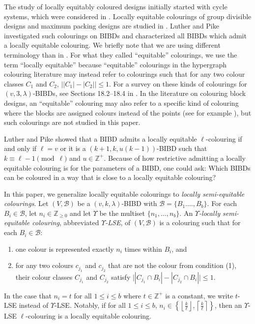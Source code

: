 \documentclass[12pt]{article}
\theoremstyle{definition}
\newcommand{\deviations}{\Upsilon}
\begin{document}
The study of locally equitably coloured designs initially started with cycle systems, which were considered in \cite{ABLW04, ABW07, BM21, BM24, LW05, W05, W06}. Locally equitable colourings of group divisible designs and maximum packing designs are studied in \cite{BDDKLPY26}. Luther and Pike \cite{L16, LP16} investigated such colourings on BIBDs and characterized all BIBDs which admit a locally equitable colouring. We briefly note that we are using different terminology than in \cite{L16, LP16}. For what they called ``equitable'' colourings, we use the term ``locally equitable'' because ``equitable'' colourings in the hypergraph colouring literature may instead refer to colourings such that for any two colour classes $C_1$ and $C_2$, $\big||C_1| - |C_2|\big| \leq 1$. For a survey on these kinds of colourings for $(v,3,\lambda)$-BIBDs, see Sections 18.2--18.4 in \cite{CR99}. In the literature on colouring block designs, an ``equitable'' colouring may also refer to a specific kind of colouring where the blocks are assigned colours instead of the points (see for example \cite{GHMR08}), but such colourings are not studied in this paper.

Luther and Pike \cite{L16, LP16} showed that a BIBD admits a locally equitable $\ell$-colouring if and only if $\ell = v$ or it is a $(k+1, k, u(k-1))$-BIBD such that $k \equiv \ell - 1 \pmod{\ell}$ and $u \in \mathbb{Z}^+$. Because of how restrictive admitting a locally equitable colouring is for the parameters of a BIBD, one could ask: Which BIBDs can be coloured in a way that is close to a locally equitable colouring?

In this paper, we generalize locally equitable colourings to \emph{locally semi-equitable colourings}. Let $(V,\mathcal{B})$ be a $(v,k,\lambda)$-BIBD with $\mathcal{B} = \{B_1. \dots, B_b\}$. For each $B_i \in \mathcal{B}$, let $n_i \in \mathbb{Z}_{\geq 0}$ and let $\deviations$ be the multiset $\{n_1, \dots, n_b\}$. An \emph{$\deviations$-locally semi-equitable colouring}, abbreviated \emph{$\deviations$-LSE}, of $(V, \mathcal{B})$ is a colouring such that for each $B_i \in \mathcal{B}$:
\begin{enumerate}
    \item[(1)] one colour is represented exactly $n_i$ times within $B_i$, and
    \item[(2)] for any two colours $c_{j_1}$ and $c_{j_2}$ that are not the colour from condition (1), their colour classes $C_{j_1}$ and $C_{j_2}$ satisfy $\big||C_{j_1} \cap B_i| - |C_{j_2} \cap B_i|\big| \leq 1$. 
\end{enumerate}
In the case that $n_i = t$ for all $1\leq i\leq b$ where $t\in \mathbb{Z}^+$ is a constant, we write $t$-LSE instead of $\deviations$-LSE. Notably, if for all $1\leq i\leq b$, $n_i \in \left\{ \left\lfloor\frac{k}{\ell}\right\rfloor, \left\lceil\frac{k}{\ell}\right\rceil \right\}$, then an $\deviations$-LSE $\ell$-colouring is a locally equitable colouring.
\end{document}
